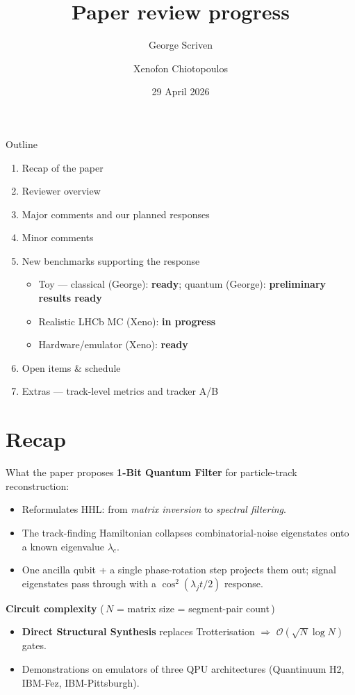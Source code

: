 \documentclass[aspectratio=169]{beamer}
\title{Paper review progress}
\author{George Scriven \and Xenofon Chiotopoulos}
\institute{\small \emph{Communications Physics} resubmission — detailed responses live in the Overleaf answer file.}
\date{29 April 2026}
\begin{document}
\maketitle

\begin{frame}{Outline}
\begin{enumerate}
  \item Recap of the paper
  \item Reviewer overview
  \item Major comments and our planned responses
  \item Minor comments
  \item New benchmarks supporting the response
  \begin{itemize}
    \item Toy --- classical (George): \textbf{ready}; quantum (George): \textbf{preliminary results ready}
    \item Realistic LHCb MC (Xeno): \textbf{in progress}
    \item Hardware/emulator (Xeno): \textbf{ready}
  \end{itemize}
  \item Open items \& schedule
  \item Extras --- track-level metrics and tracker A/B
\end{enumerate}
\end{frame}

\section{Recap}

\begin{frame}{What the paper proposes}
\textbf{1-Bit Quantum Filter} for particle-track reconstruction:
\begin{itemize}
  \item Reformulates HHL: from \emph{matrix inversion} to \emph{spectral filtering}.
  \item The track-finding Hamiltonian collapses combinatorial-noise eigenstates onto a known eigenvalue $\lambda_c$.
  \item One ancilla qubit + a single phase-rotation step projects them out; signal eigenstates pass through with a $\cos^2(\lambda_j t/2)$ response.
\end{itemize}
\smallskip
\textbf{Circuit complexity} (\,$N$ = matrix size = segment-pair count\,)
\begin{itemize}
  \item \textbf{Direct Structural Synthesis} replaces Trotterisation $\Rightarrow$ $\mathcal{O}(\sqrt{N}\log N)$ gates.
  \item Demonstrations on emulators of three QPU architectures (Quantinuum H2, IBM-Fez, IBM-Pittsburgh).
\end{itemize}
\end{frame}
\end{document}
